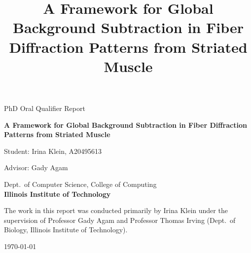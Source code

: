 \documentclass[11pt,onecolumn]{IEEEtran}
\title{A Framework for Global Background Subtraction in Fiber Diffraction Patterns from Striated Muscle}
\author{}
\date{}
\begin{document}
\singlespacing

\nolinenumbers
\begin{titlepage}
    \centering

    {\Large PhD Oral Qualifier Report\par}



    \vspace{3cm}

    {\LARGE\bfseries A Framework for Global Background Subtraction in Fiber Diffraction Patterns from Striated Muscle\par}

    \vspace{3cm}

    \vspace{0.5cm}
    Student: Irina Klein, A20495613\par

    \vspace{1cm}

    {\large Advisor: Gady Agam\par}
    \vspace{1cm}

    
	\footnotesize{Dept.~of Computer Science, College of Computing}\\[.5ex] \large{\bf Illinois Institute of Technology}

    \vspace{2cm}

    The work in this report was conducted primarily by Irina Klein under the supervision of Professor Gady Agam and Professor Thomas Irving (Dept.~of Biology, Illinois Institute of Technology). \par

    \vspace{2cm}


    \vfill

    {\large\today\par}
\end{titlepage}


\setcounter{page}{1}

\end{document}

